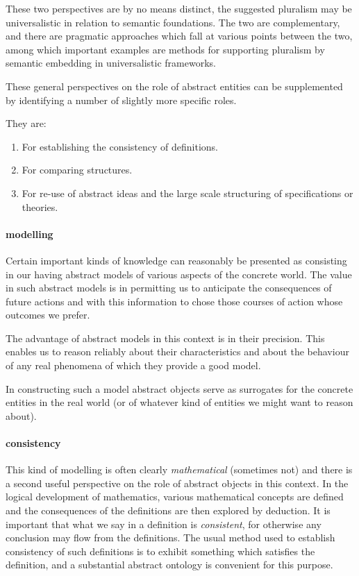 These two perspectives are by no means distinct, the suggested pluralism may be universalistic in relation to semantic foundations.
The two are complementary, and there are pragmatic approaches which fall at various points between the two, among which important examples are methods for supporting pluralism by semantic embedding in universalistic frameworks.

These general perspectives on the role of abstract entities can be supplemented by identifying a number of slightly more specific roles.

They are:

\begin{enumerate}
\item For establishing the consistency of definitions.
\item For comparing structures.
\item For re-use of abstract ideas and the large scale structuring of specifications or theories.
\end{enumerate}

\paragraph{modelling}

Certain important kinds of knowledge can reasonably be presented as consisting in our having abstract models of various aspects of the concrete world.
The value in such abstract models is in permitting us to anticipate the consequences of future actions and with this information to chose those courses of action whose outcomes we prefer.

The advantage of abstract models in this context is in their precision.
This enables us to reason reliably about their characteristics and about the behaviour of any real phenomena of which they provide a good model.

In constructing such a model abstract objects serve as surrogates for the concrete entities in the real world (or of whatever kind of entities we might want to reason about).

\paragraph{consistency}

This kind of modelling is often clearly \emph{mathematical} (sometimes not) and there is a second useful perspective on the role of abstract objects in this context.
In the logical development of mathematics, various mathematical concepts are defined and the consequences of the definitions are then explored by deduction.
It is important that what we say in a definition is \emph{consistent}, for otherwise any conclusion may flow from the definitions.
The usual method used to establish consistency of such definitions is to exhibit something which satisfies the definition, and a substantial abstract ontology is convenient for this purpose.

